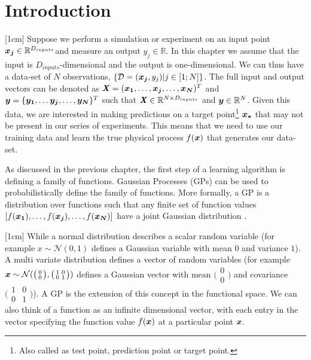 
\section{Introduction}
[1cm]
Suppose we perform a simulation or experiment on an input point $\boldsymbol{x_{j}} \in \mathbb{R}^{D_{inputs}}$and measure an output $y_{j} \in \mathbb{R}$. In this chapter we assume that the input is $D_{inputs}$-dimensional and the output is one-dimensional. We can thus have a data-set of $N$ observations, $\{\mathcal{D} = (\boldsymbol{x_{j}}, y_{j}) | j \in [1; N] \}$. The full input and output vectors can be denoted as $\bm{\mathit{X}} = (\boldsymbol{x_{1}}, \ldots , \boldsymbol{x_{j}}, \ldots, \boldsymbol{x_{N}})^T$ and $\boldsymbol{y} = \{\boldsymbol{y_{1}}, \ldots \boldsymbol{y_j}, \ldots, \boldsymbol{y_{N}}\}^T$ such that $\bm{\mathit{X}} \in \mathbb{R}^{N \times D_{inputs}}$ and $\boldsymbol{y} \in \mathbb{R}^{N }$. Given this data, we are interested in making predictions on a target point\footnote{Also called as test point, prediction point or target point.} $\boldsymbol{x_{*}}$ that may not be present in our series of experiments. This means that we need to use our training data and learn the true physical process $f(\boldsymbol{x})$ that generates our data-set.

As discussed in the previous chapter, the first step of a learning algorithm is defining a family of functions. Gaussian Processes (GPs) can be used to probabilistically define the family of functions. More formally, a GP is a distribution over functions such that any finite set of function values $[f(\boldsymbol{x_{1}}), \ldots, f(\boldsymbol{x_{j}}), \ldots, f(\boldsymbol{x_{N}})]$ have a joint Gaussian distribution \cite{Rasmussen2005}. 

[1cm]
While a normal distribution describes a scalar random variable (for example $x \sim \mathcal{N}(0, 1)$ defines a Gaussian variable with mean $0$ and variance $1$). A multi variate distribution defines a vector of random variables (for example $\boldsymbol{x} \sim \mathcal{N}(\bigl( \begin{smallmatrix} 0\\ 0\end{smallmatrix}\bigr), \bigl( \begin{smallmatrix} 1 & 0\\ 0 & 1\end{smallmatrix}\bigr))$ defines a Gaussian vector with mean $\bigl( \begin{smallmatrix} 0\\ 0\end{smallmatrix}\bigr)$ and covariance $\bigl( \begin{smallmatrix} 1 & 0\\ 0 & 1\end{smallmatrix}\bigr)$). A GP is the extension of this concept in the functional space. We can also think of a function as an infinite dimensional vector, with each entry in the vector specifying the function value $f(\boldsymbol{x})$ at a particular point $\boldsymbol{x}$. 

